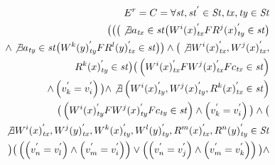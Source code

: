 \documentclass{sig-alternate-05-2015}
\begin{document}
\begin{align}
\begin{split}
E^{r} = C = \forall \mathit{st}, \mathit{st}^{'} \in \mathit{St}, \mathit{tx}, \mathit{ty} \in \mathit{St} \\ \big(
 \big( \big( \not\exists a_\mathit{tx} \in \mathit{st}
 \big(  {W^i}(x)^{'}_\mathit{tx} F {R^j}(x)^{'}_\mathit{ty} \in \mathit{st} \big) \\
  \wedge  \not\exists a_\mathit{ty} \in \mathit{st}
 \big( {W^k}(y)^{'}_\mathit{ty} F {R^l}(y)^{'}_\mathit{tx} \in \mathit{st}  \big) \big) \wedge
 \big( \not\exists  {W^i}(x)^{'}_\mathit{tx}, {W^j}(x)^{'}_\mathit{tx}, \\ {R^k}(x)^{'}_\mathit{ty} \in  \mathit{st}  \big)
 \big( \left( {W^i}(x)^{'}_\mathit{tx}  F {W^j}(x)^{'}_\mathit{tx} F  c_\mathit{tx} \in  \mathit{st} \right) \\
   \wedge \left( v_k^{'} = v_i^{'} \right)  \big)  \wedge
   \not\exists \left( {W^i}(x)^{'}_\mathit{ty}, {W^j}(x)^{'}_\mathit{ty}, {R^k}(x)^{'}_\mathit{tx} \in  \mathit{st} \right) \\
    \big( \left(
 {W^i}(x)^{'}_\mathit{ty}  F {W^j}(x)^{'}_\mathit{ty} F  c_\mathit{ty} \in  \mathit{st} \right)
   \wedge \left( v_k^{'} = v_i^{'} \right)  \big) \wedge
  \big( \\ \not\exists {W^i}(x)^{'}_\mathit{tx},  {W^j}(y)^{'}_\mathit{tx},
  {W^k}(x)^{'}_\mathit{ty}, {W^l}(y)^{'}_\mathit{ty}, {R^m}(x)^{'}_\mathit{tx}, {R^n}(y)^{'}_\mathit{ty} \in \mathit{St} \\ \big)
\big( \left( \left( v_n^{'} = v_l^{'} \right) \wedge \left( v_m^{'} = v_i^{'} \right) \right) \vee \left( \left( v_n^{'} = v_j^{'} \right) \wedge \left( v_m^{'} = v_k^{'} \right) \right)  \big) \wedge \\

\end{split}
\end{align}
\end{document}
